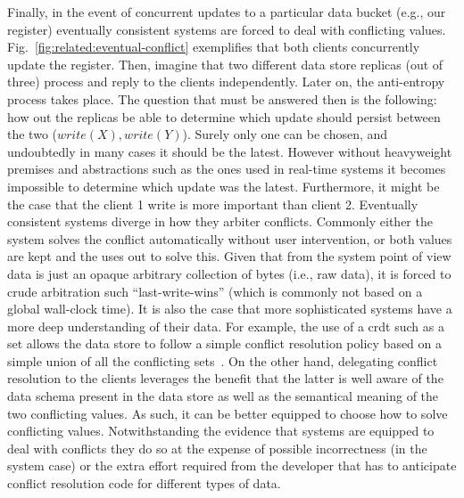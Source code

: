 Finally, in the event of concurrent updates to a particular data bucket (e.g., our register) eventually consistent systems are forced to deal with conflicting values. 
Fig.~\ref{fig:related:eventual-conflict} exemplifies that  both clients concurrently update the register. 
Then, imagine that two different data store replicas (out of three) process and reply to the clients independently. 
Later on, the anti-entropy process takes place. The question that must be answered then is the following: how out the replicas be able to determine which update should persist between the two ($write(X), write(Y)$). 
Surely only one can be chosen, and undoubtedly in many cases it should be the latest. 
However without heavyweight premises and abstractions  such as the ones used in real-time systems it becomes impossible to determine which update was the latest. 
Furthermore, it might be the case that the client 1 write is more important than client 2. 
Eventually consistent systems diverge in how they arbiter conflicts. 
Commonly either the system solves the conflict automatically without user intervention, or both values are kept and the uses out to solve this. 
Given that from the system point of view data is just an opaque arbitrary collection of bytes (i.e., raw data), it is forced to crude arbitration such ``last-write-wins'' (which is commonly not based on a global wall-clock time). It is also the case that more sophisticated systems have a more deep understanding of their data. 
For example, the use of a \gls{crdt} such as a set allows the data store to follow a simple conflict resolution policy  based on a simple union of all the conflicting sets~\cite{shapiro:inria-00555588}. 
On the other hand, delegating conflict resolution to the clients leverages the benefit that the latter is well aware of the data schema present in the data store as well as the semantical meaning of the two conflicting values. 
As such, it can be better equipped to choose how to solve conflicting values.
Notwithstanding  the evidence that systems are equipped to deal with conflicts they do so at the expense of possible incorrectness (in the system case) or the extra effort required from the developer that has to anticipate conflict resolution code for different types of data. 


